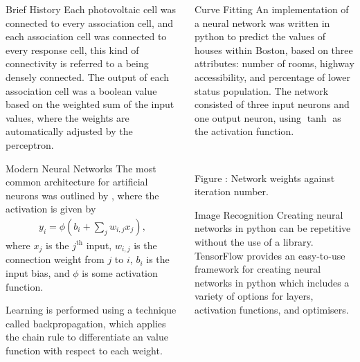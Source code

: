 \documentclass[final]{beamer}
\newcommand{\rfig}[3][1em]{%
    \refstepcounter{figure}
    \vspace{1cm}
    \begin{center}
        #2
        \vspace{#1}\\
        \parbox{0.8\columnwidth}{\centering Figure \thefigure: #3}
    \end{center}
    \vspace{1cm}
}
\begin{document}
\begin{frame}[t]
\begin{columns}
\begin{column}[t]{0.3\textwidth}
\begin{block}{Brief History}
        Each photovoltaic cell was connected to every association cell, and each
        association cell was connected to every response cell, this kind of
        connectivity is referred to a being densely connected.
        The output of each association cell was a boolean value based on the
        weighted sum of the input values, where the weights are automatically
        adjusted by the perceptron.
    \end{block}
    \vspace{1cm}
    \begin{block}{Modern Neural Networks}
        The most common architecture for artificial neurons was outlined by
        \cite{McClelland:1986:Parallel}, where the activation is given by
        \begin{align*}
            y_i = \phi\left(b_i + \sum_j w_{i,j}x_j\right),
        \end{align*}
        where $x_j$ is the $j^\text{th}$ input, $w_{i,j}$ is the connection
        weight from $j$ to $i$, $b_i$ is the input bias, and $\phi$ is some
        activation function.

        Learning is performed using a technique called backpropagation, which
        applies the chain rule to differentiate an value function with respect
        to each weight.
    \end{block}

\end{column}
\begin{column}[t]{0.3\textwidth}

    \begin{block}{Curve Fitting}
        An implementation of a neural network was written in python to predict
        the values of houses within Boston, based on three attributes:
        number of rooms, highway accessibility, and percentage of lower status
        population.
        The network consisted of three input neurons and one output neuron,
        using $\tanh$ as the activation function.
        \rfig[-1ex]{}{%
            Network weights against iteration number.
        }
    \end{block}
    \vspace{1cm}
    \begin{block}{Image Recognition}
        Creating neural networks in python can be repetitive without the use of
        a library.
        TensorFlow provides an easy-to-use framework for creating neural
        networks in python which includes a variety of options for layers,
        activation functions, and optimisers.


\end{block}
\end{column}
\end{columns}
\end{frame}
\end{document}
